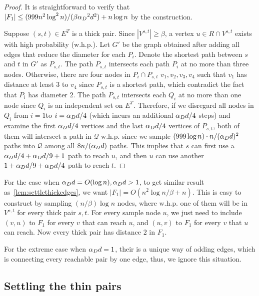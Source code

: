 \settlethick*
\begin{proof}
It is straightforward to verify that $|F_1| \le (999n^2\log^2 n)/(\beta\alpha_D{}^2 d^2)+n\log n$ by the construction.

Suppose $(s,t)\in E^T$ is a thick pair. Since $|V^{s,t}|\ge \beta$, a vertex $u\in R\cap V^{s,t}$ exists with high probability (w.h.p.). %
Let $G'$ be the graph obtained after adding all edges that reduce the diameter for each $P_i$. Denote the shortest path between $s$ and $t$ in $G'$ as $P_{s,t}$. 
The path $P_{s,t}$ intersects each path $P_i$ at no more than three nodes. Otherwise, there are four nodes in $P_i\cap P_{s,t}$ $v_1,v_2,v_3,v_4$ such that $v_1$ has distance at least $3$ to $v_4$ since $P_{s,t}$ is a shortest path, which contradict the fact that $P_i$ has diameter $2$. The path $P_{s,t}$ intersects each $Q_i$ at no more than one node since $Q_i$ is an independent set on $E^T$.
Therefore, if we disregard all nodes in $Q_i$ from $i=1$to $i=\alpha_D{} d/ 4$ (which incurs an additional $\alpha_D{} d/4$ steps) and examine the first $\alpha_D{} d/4$ vertices and the last $\alpha_D{} d/4$ vertices of $P_{s,t}$, both of them will intersect a path in ${\mathcal Q}$ w.h.p. since we sample $(999\log n)\cdot n/(\alpha_D{} d)^2$ paths into ${\mathcal Q}$ among all $8n/(\alpha_D d)$ paths. This implies that $s$ can first use a $\alpha_D{} d/4+\alpha_D{} d/9+1$ path to reach $u$, and then $u$ can use another $1+\alpha_D{} d/9+\alpha_D{} d/4$ path to reach $t$. 
\end{proof}

For the case when $\alpha_D{}d=O(\log n),\alpha_D{}d>1$, to get similar result as~\cref{lem:settlethickedges}, we want $|F_1|=O(n^2\log n/\beta+n)$. This is easy to construct by sampling $(n/\beta)\log n$ nodes, where w.h.p. one of them will be in $V^{s,t}$ for every thick pair $s,t$. For every sample node $u$, we just need to include $(v,u)$ to $F_1$ for every $v$ that can reach $u$, and $(u,v)$ to $F_1$ for every $v$ that $u$ can reach. Now every thick pair has distance $2$ in $F_1$. 

For the extreme case when $\alpha_D{}d=1$, their is a unique way of adding edges, which is connecting every reachable pair by one edge, thus, we ignore this situation.

\subsection{Settling the thin pairs}\label{subsec:thinedges}



